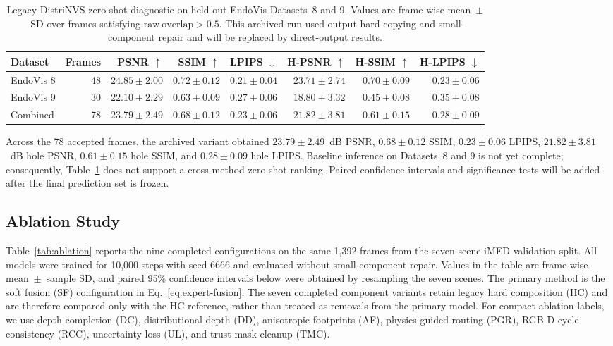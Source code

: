 \documentclass[letterpaper,10pt,conference]{ieeeconf}
\begin{document}
\begin{table}[t]
\centering
\caption{Legacy DistriNVS zero-shot diagnostic on held-out EndoVis Datasets~8 and 9.
Values are frame-wise mean~$\pm$~SD over frames satisfying
$\mathrm{raw\ overlap}>0.5$. This archived run used output hard copying and
small-component repair and will be replaced by direct-output results.}
\label{tab:zeroshot-breakdown}
\setlength{\tabcolsep}{3.2pt}
\begin{tabular}{lrrrrrrr}
\toprule
Dataset & Frames & PSNR $\uparrow$ & SSIM $\uparrow$ & LPIPS $\downarrow$ &
H-PSNR $\uparrow$ & H-SSIM $\uparrow$ & H-LPIPS $\downarrow$ \\
\midrule
EndoVis 8 & 48 & $\mathbf{24.85\pm2.00}$ & $\mathbf{0.72\pm0.12}$ &
$\mathbf{0.21\pm0.04}$ & $\mathbf{23.71\pm2.74}$ &
$\mathbf{0.70\pm0.09}$ & $\mathbf{0.23\pm0.06}$ \\
EndoVis 9 & 30 & $22.10\pm2.29$ & $0.63\pm0.09$ & $0.27\pm0.06$ &
$18.80\pm3.32$ & $0.45\pm0.08$ & $0.35\pm0.08$ \\
\midrule
Combined & 78 & $23.79\pm2.49$ & $0.68\pm0.12$ & $0.23\pm0.06$ &
$21.82\pm3.81$ & $0.61\pm0.15$ & $0.28\pm0.09$ \\
\bottomrule
\end{tabular}
\end{table}

Across the 78 accepted frames, the archived variant obtained
$23.79\pm2.49$~dB PSNR, $0.68\pm0.12$ SSIM,
$0.23\pm0.06$ LPIPS, $21.82\pm3.81$~dB hole PSNR,
$0.61\pm0.15$ hole SSIM, and $0.28\pm0.09$ hole LPIPS. Baseline inference on
Datasets~8 and 9 is not yet complete; consequently,
Table~\ref{tab:zeroshot-breakdown} does not support a cross-method zero-shot
ranking. Paired confidence intervals and significance tests will be added after
the final prediction set is frozen.

\subsection{Ablation Study}

Table~\ref{tab:ablation} reports the nine completed configurations on the same
1,392 frames from the seven-scene iMED validation split. All models were
trained for 10,000 steps with seed 6666 and evaluated without small-component
repair. Values in the table are frame-wise mean~$\pm$~sample SD, and paired
95\% confidence intervals below were obtained by resampling the seven scenes.
The primary method is the soft fusion (SF) configuration in
Eq.~\eqref{eq:expert-fusion}. The seven completed component variants retain
legacy hard composition (HC) and are therefore compared only with the HC
reference, rather than treated as removals from the primary model. For compact
ablation labels, we use depth completion (DC), distributional depth (DD),
anisotropic footprints (AF), physics-guided routing (PGR), RGB-D cycle
consistency (RCC), uncertainty loss (UL), and trust-mask cleanup (TMC).
\end{document}
